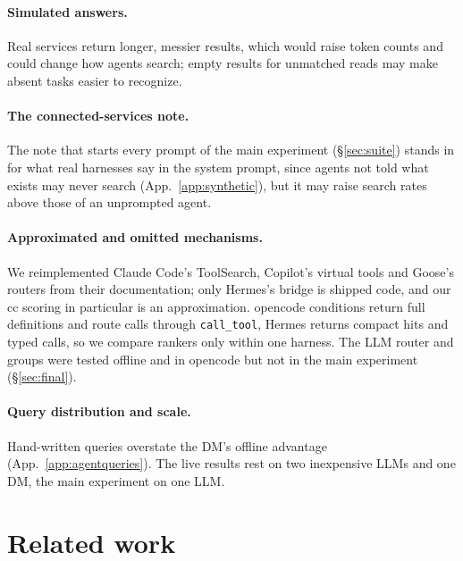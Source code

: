\documentclass[11pt]{article}
\begin{document}
\paragraph{Simulated answers.} Real services return longer, messier results, which would raise token counts and could
change how agents search; empty results for unmatched reads may make absent tasks easier to recognize.

\paragraph{The connected-services note.} The note that starts every prompt of the main experiment
(\S\ref{sec:suite}) stands in for what real harnesses say in the system prompt, since agents not told what exists
may never search (App.~\ref{app:synthetic}), but it may raise search rates above those of an unprompted agent.

\paragraph{Approximated and omitted mechanisms.} We reimplemented Claude Code's ToolSearch, Copilot's virtual
tools and Goose's routers from their documentation; only Hermes's bridge is shipped code, and our cc scoring in
particular is an approximation. opencode conditions return full definitions and route calls through
\texttt{call\_tool}, Hermes returns compact hits and typed calls, so we compare rankers only within one harness.
The LLM router and groups were tested offline and in opencode but not in the main experiment
(\S\ref{sec:final}).

\paragraph{Query distribution and scale.} Hand-written queries overstate the DM's offline advantage
(App.~\ref{app:agentqueries}). The live results rest on two inexpensive LLMs and one DM, the main experiment on
one LLM.

\section{Related work}\label{sec:related}
\end{document}
